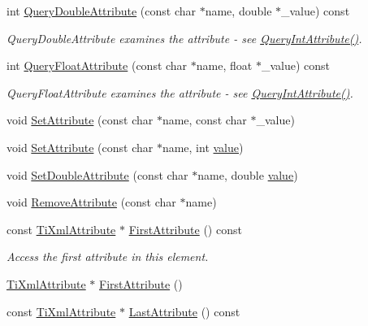 \begin{DoxyCompactItemize}
\item 
int \hyperlink{class_ti_xml_element_a898d7730ecc341f0bffc7a9dadbf1ce7}{Query\+Double\+Attribute} (const char $\ast$name, double $\ast$\+\_\+value) const 
\begin{DoxyCompactList}\small\item\em Query\+Double\+Attribute examines the attribute -\/ see \hyperlink{class_ti_xml_element_aea0bfe471380f281c5945770ddbf52b9}{Query\+Int\+Attribute()}. \end{DoxyCompactList}\item 
int \hyperlink{class_ti_xml_element_aa04d3af11601ef5a5f88295203a843be}{Query\+Float\+Attribute} (const char $\ast$name, float $\ast$\+\_\+value) const 
\begin{DoxyCompactList}\small\item\em Query\+Float\+Attribute examines the attribute -\/ see \hyperlink{class_ti_xml_element_aea0bfe471380f281c5945770ddbf52b9}{Query\+Int\+Attribute()}. \end{DoxyCompactList}\item 
void \hyperlink{class_ti_xml_element_abf0b3bd7f0e4c746a89ec6e7f101fc32}{Set\+Attribute} (const char $\ast$name, const char $\ast$\+\_\+value)
\item 
void \hyperlink{class_ti_xml_element_ace6f4be75e373726d4774073d666d1a7}{Set\+Attribute} (const char $\ast$name, int \hyperlink{class_ti_xml_node_aead528b3cedc33c16a6c539872c7cc8b}{value})
\item 
void \hyperlink{class_ti_xml_element_a0d1dd975d75496778177e35abfe0ec0b}{Set\+Double\+Attribute} (const char $\ast$name, double \hyperlink{class_ti_xml_node_aead528b3cedc33c16a6c539872c7cc8b}{value})
\item 
void \hyperlink{class_ti_xml_element_a56979767deca794376b1dfa69a525b2a}{Remove\+Attribute} (const char $\ast$name)
\item 
const \hyperlink{class_ti_xml_attribute}{Ti\+Xml\+Attribute} $\ast$ \hyperlink{class_ti_xml_element_a516054c9073647d6cb29b6abe9fa0592}{First\+Attribute} () const 
\begin{DoxyCompactList}\small\item\em Access the first attribute in this element. \end{DoxyCompactList}\item 
\hyperlink{class_ti_xml_attribute}{Ti\+Xml\+Attribute} $\ast$ \hyperlink{class_ti_xml_element_a4b33780fc565d38d6b54f640e0cf1737}{First\+Attribute} ()
\item 
const \hyperlink{class_ti_xml_attribute}{Ti\+Xml\+Attribute} $\ast$ \hyperlink{class_ti_xml_element_a86191b49f9177be132b85b14655f1381}{Last\+Attribute} () const 

\end{DoxyCompactItemize}
